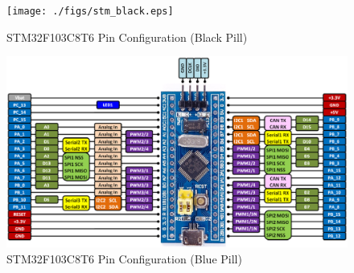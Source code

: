 \documentclass[journal,12pt,twocolumn]{IEEEtran}
\begin{document}
\begin{figure}[!h]
\centering
\texttt{[image: ./figs/stm\_black.eps]}
\caption{STM32F103C8T6 Pin Configuration (Black Pill)}
\label{fig:stm_black}
\end{figure}
%
\begin{figure}[!h]
\centering
\includegraphics[width=\columnwidth]{./figs/stm_blue.eps}
\caption{STM32F103C8T6 Pin Configuration (Blue Pill)}
\label{fig:stm_blue}
\end{figure}
%
\end{document}
